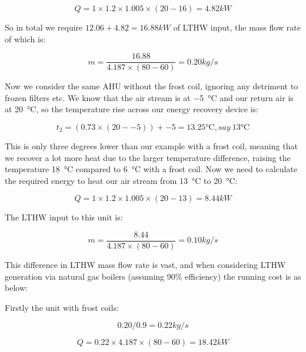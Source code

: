 \begin{equation}
Q = 1 \times 1.2 \times 1.005 \times (20-16) = 4.82 kW
\end{equation}

So in total we require $12.06 + 4.82 = 16.88 kW$ of LTHW input, the mass flow rate of which is:

\begin{equation}\label{eq:AHUfrostCoilExample}
m = \frac{16.88}{4.187 \times (80-60)} = 0.20 kg/s
\end{equation}

Now we consider the same AHU without the frost coil, ignoring any detriment to frozen filters etc.  We know that the air stream is at \SI{-5}{\celsius} and our return air is at \SI{20}{\celsius}, so the temperature rise across our energy recovery device is:

\begin{equation}
t_2 = (0.73 \times (20 - -5)) + -5 = 13.25\si{\celsius}, say~13\si{\celsius}
\end{equation}

This is only three degrees lower than our example with a frost coil, meaning that we recover a lot more heat due to the larger temperature difference, raising the temperature \SI{18}{\celsius} compared to \SI{6}{\celsius} with a frost coil.  Now we need to calculate the required energy to heat our air stream from \SI{13}{\celsius} to \SI{20}{\celsius}:

\begin{equation}
Q = 1 \times 1.2 \times 1.005 \times (20-13) = 8.44 kW
\end{equation}

The LTHW input to this unit is:

\begin{equation}\label{eq:AHUnoFrostCoilExample}
m = \frac{8.44}{4.187 \times (80-60)} = 0.10 kg/s
\end{equation}

This difference in LTHW mass flow rate is vast, and when considering LTHW generation via natural gas boilers (assuming 90\% efficiency) the running cost is as below:

Firstly the unit with frost coils:

\begin{equation}
0.20 / 0.9 = 0.22 kg/s
\end{equation}

\begin{equation}
Q = 0.22 \times 4.187 \times (80-60) = 18.42 kW
\end{equation}

